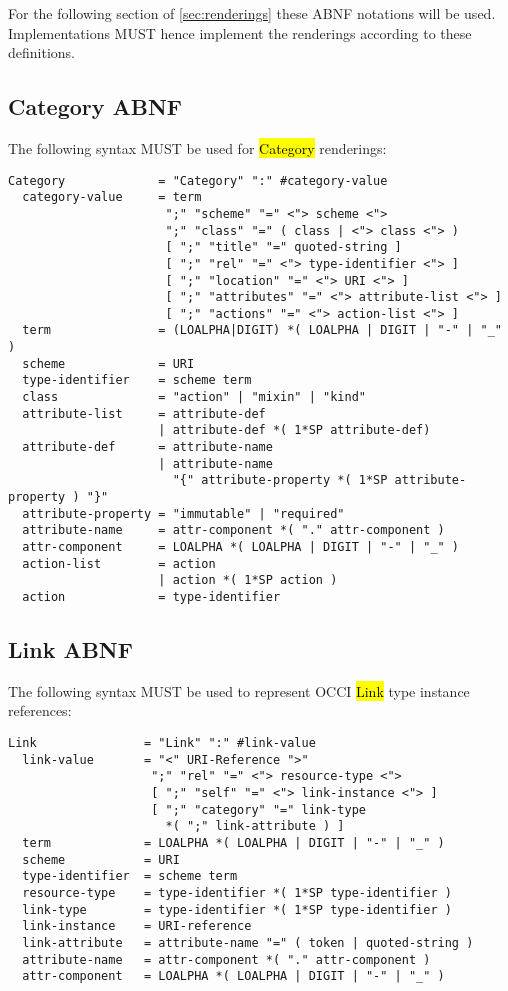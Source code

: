 \documentclass[10pt,a4paper]{article}
\begin{document}
For the following section of \ref{sec:renderings} these ABNF notations will be used. Implementations MUST hence implement the renderings according to these definitions.

\subsection{Category ABNF}

The following syntax MUST be used for \hl{Category} renderings:

\begin{verbatim}
Category             = "Category" ":" #category-value
  category-value     = term
                      ";" "scheme" "=" <"> scheme <">
                      ";" "class" "=" ( class | <"> class <"> )
                      [ ";" "title" "=" quoted-string ]
                      [ ";" "rel" "=" <"> type-identifier <"> ]
                      [ ";" "location" "=" <"> URI <"> ]
                      [ ";" "attributes" "=" <"> attribute-list <"> ]
                      [ ";" "actions" "=" <"> action-list <"> ]
  term               = (LOALPHA|DIGIT) *( LOALPHA | DIGIT | "-" | "_" )
  scheme             = URI
  type-identifier    = scheme term
  class              = "action" | "mixin" | "kind"
  attribute-list     = attribute-def
                     | attribute-def *( 1*SP attribute-def)
  attribute-def      = attribute-name
                     | attribute-name
                       "{" attribute-property *( 1*SP attribute-property ) "}"
  attribute-property = "immutable" | "required"
  attribute-name     = attr-component *( "." attr-component )
  attr-component     = LOALPHA *( LOALPHA | DIGIT | "-" | "_" )
  action-list        = action
                     | action *( 1*SP action )
  action             = type-identifier
\end{verbatim}

\subsection{Link ABNF}

The following syntax MUST be used to represent OCCI \hl{Link} type
instance references:

\begin{verbatim}
Link               = "Link" ":" #link-value
  link-value       = "<" URI-Reference ">"
                    ";" "rel" "=" <"> resource-type <">
                    [ ";" "self" "=" <"> link-instance <"> ]
                    [ ";" "category" "=" link-type
                      *( ";" link-attribute ) ]
  term             = LOALPHA *( LOALPHA | DIGIT | "-" | "_" )
  scheme           = URI
  type-identifier  = scheme term
  resource-type    = type-identifier *( 1*SP type-identifier )
  link-type        = type-identifier *( 1*SP type-identifier )
  link-instance    = URI-reference
  link-attribute   = attribute-name "=" ( token | quoted-string )
  attribute-name   = attr-component *( "." attr-component )
  attr-component   = LOALPHA *( LOALPHA | DIGIT | "-" | "_" )
\end{verbatim}
\end{document}
